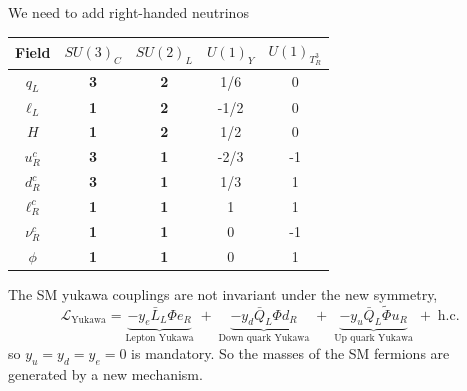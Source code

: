 \documentclass{../bredelebeamer}
\begin{document}
\begin{frame}%
	We need to add right-handed neutrinos
	\begin{table}[h]
    \centering
    \begin{tabular}{ccccc}
    \hline
    \hline
        Field & $SU(3)_C$  & $SU(2)_L$ & $U(1)_Y$ & $U(1)_{T^3_R}$ \\
    \hline\hline
        $q_L$                    & \bf{3} & \bf{2} & 1/6 & 0\\
        $\ell_L$                 & \bf{1} & \bf{2} & -1/2 & 0\\
        $H$                         & \bf{1} & \bf{2} & 1/2 & 0\\
        \hline
        $u_R^{  c}$          & \bf{3} & \bf{1} & -2/3 & -1\\
        $d_R^{  c}$          & \bf{3} & \bf{1} & 1/3 & 1\\
        $\ell_R^{  c}$       & \bf{1} & \bf{1} & 1 & 1\\
        $\nu_R^{  c}$        & \bf{1} & \bf{1} & 0 & -1\\
        $\phi$                      & \bf{1} & \bf{1} & 0 & 1\\
    \hline
    \hline
    \end{tabular}
\end{table}
\pause
The SM yukawa couplings are not invariant under the new symmetry,
\begin{equation}
\mathcal{L}_{\text{Yukawa}} = 
\underbrace{-y_e \bar{L}_L \Phi e_R}_{\text{Lepton Yukawa}}
\; + \;
\underbrace{-y_d \bar{Q}_L \Phi d_R}_{\text{Down quark Yukawa}}
\; + \;
\underbrace{-y_u \bar{Q}_L \tilde{\Phi} u_R}_{\text{Up quark Yukawa}}
\; + \; \text{h.c.}
\end{equation}
so $y_u=y_d=y_e=0$ is mandatory. So the masses of the SM fermions are generated by a new mechanism.
\end{frame}
\end{document}

